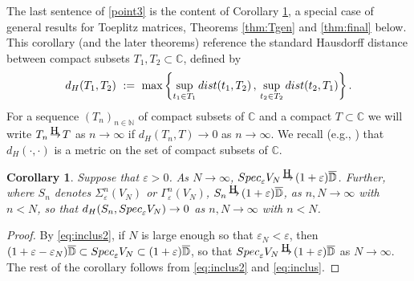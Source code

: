 \documentclass[preprint,1p,11pt]{elsarticle}
\newcommand{\bl}[1]{\textcolor{blue}{#1}}   %
\newcommand\C{{\mathbb C}}
\newcommand\D{{\mathbb D}}
\newcommand\N{{\mathbb N}}
\newcommand\eps{{\varepsilon}}
\newcommand\Speps{{\rm Spec}_\eps}
\newcommand\dist{{\rm dist}}
\newcommand\Hto{
   \unitlength0.1ex
   \begin{picture}(30,15)
   \put(13,16){\makebox(0,0)[]{\tiny\rm H}}
   \put(15,5){\makebox(0,0)[]{$\to$}}
   \end{picture}
}
\newtheorem{corollary}[theorem]{Corollary}
\numberwithin{equation}{section}   %
\numberwithin{figure}{section}  %
\begin{document}
The last sentence of \ref{point3} is the content of Corollary \ref{cor:convVN},  %
a special case of general results
for 
Toeplitz matrices, Theorems \ref{thm:Tgen} and \ref{thm:final} below. This corollary (and the later theorems) reference the standard  Hausdorff distance between compact subsets $T_1,T_2 \subset \C$, defined by
\begin{equation} \label{eq:HD}
d_H(T_1,T_2)\ :=\ \max\left\{ \sup_{t_1\in T_1} \dist(t_1,T_2)\,,\, \sup_{t_2\in T_2}\dist(t_2,T_1)\right\}.
\end{equation} 
For a sequence $(T_n)_{n\in \N}$ of compact subsets of $\C$ and a compact $T\subset \C$ we will write $T_n\Hto T$ as $n\to\infty$ if $d_H(T_n,T)\to 0$ as $n\to\infty$. We recall (e.g., \cite{HaRoSi2})  that $d_H(\cdot,\cdot)$ is a metric on the set of compact subsets of $\C$.
 

\begin{corollary} \label{cor:convVN}
Suppose that $\eps>0$. As $N\to\infty$, $\Speps V_N\Hto (1+\eps)\overline{\D}$. Further, where $S_n$ denotes  $\Sigma_\eps^n(V_N)$ or $\Gamma_\eps^n(V_N)$,  $S_n\Hto (1+\eps)\overline{\D}$, as $n,N\to\infty$ with $n< N$, so that $d_H(S_n,\Speps V_N)\to 0$ as $n,N\to\infty$ with $n<N$. 
\end{corollary}
\begin{proof}
By \eqref{eq:inclus2}, if $N$ is large enough so that $\eps_N<\eps$, then $(1+\eps-\eps_N)\overline{\D} \subset \Speps V_N \subset (1+\eps)\overline{\D}$, so that $\Speps V_N\Hto (1+\eps)\overline{\D}$ as $N\to\infty$. The rest of the corollary follows from \eqref{eq:inclus2} and \eqref{eq:inclus}.
\end{proof}
\end{document}

